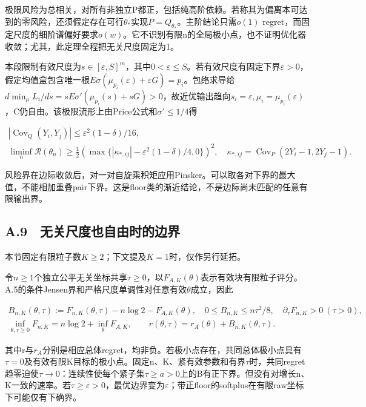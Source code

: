 \documentclass[11pt,a4paper]{article}
\begin{document}
极限风险为总相关，对所有非独立P都正，包括纯高阶依赖。若称其为偏离本可达到的零风险，还须假定存在可行\(\theta_*\)实现\(P=Q_{\theta_*}\)。主阶结论只需\(o(1)\)
regret，而固定尺度的细阶谱偏好要求\(o(w)\)。它不识别有限n的全局极小点，也不证明优化器收敛；尤其，此定理全程把无关尺度固定为1。

本段限制有效尺度为\(s\in[\varepsilon,S]^m\)，其中\(0<\varepsilon\le S\)。若有效尺度有固定下界\(\varepsilon>0\)，假定均值盒包含唯一根\(E\sigma(\mu_{p_i}(\varepsilon)+\varepsilon G)=p_i\)。包络求导给\(d\min_\mu L_i/ds=sE\sigma'(\mu_{p_i}(s)+sG)>0\)，故近优输出趋向\(s_i=\varepsilon,\mu_i=\mu_{p_i}(\varepsilon)\)，C仍自由。该极限流形上由Price公式和\(\sigma'\le1/4\)得

\[
\begin{gathered}
|\operatorname{Cov}_Q(Y_i,Y_j)|\le\varepsilon^2(1-\delta)/16,\\
\liminf_n\mathcal R(\theta_n)\ge\tfrac12
\left(\max\{|\kappa_{*,ij}|-\varepsilon^2(1-\delta)/4,0\}\right)^2,
\quad \kappa_{*,ij}=\operatorname{Cov}_P(2Y_i-1,2Y_j-1).
\end{gathered}
\tag{A.45}
\]

风险界在边际收敛后，对一对自旋乘积矩应用Pinsker。可以取各对下界的最大值，不能相加重叠pair下界。这是floor类的渐近结论，不是边际尚未匹配的任意有限输出界。

\subsection*{A.9　无关尺度也自由时的边界}\label{a.9-ux65e0ux5173ux5c3aux5ea6ux4e5fux81eaux7531ux65f6ux7684ux8fb9ux754c}

本节固定有限粒子数\(K\ge2\)；下文提及\(K=1\)时，仅作另行延拓。

令\(n\ge1\)个独立公平无关坐标共享\(\tau\ge0\)，以\(F_{A,K}(\theta)\)表示有效块有限粒子评分。A.5的条件Jensen界和严格尺度单调性对任意有效\(\theta\)成立，因此

\[
\begin{gathered}
B_{n,K}(\theta,\tau):=F_{n,K}(\theta,\tau)-n\log2-F_{A,K}(\theta),\quad
0\le B_{n,K}\le n\tau^2/8,\quad \partial_\tau F_{n,K}>0\ (\tau>0),\\
\inf_{\theta,\tau\ge0}F_{n,K}=n\log2+\inf_\theta F_{A,K},\qquad
r(\theta,\tau)=r_A(\theta)+B_{n,K}(\theta,\tau).
\end{gathered}
\tag{A.46}
\]

其中r与\(r_A\)分别是相应总体regret，均非负。若极小点存在，共同总体极小点具有\(\tau=0\)及有效有限K目标的极小点。固定n、K、紧有效参数和有界\(\tau\)时，共同regret趋零迫使\(\tau\to0\)：连续性使每个紧子集\(\tau\ge a>0\)上的B有正下界。但没有对增长n、K一致的速率。若\(\tau\ge\varepsilon>0\)，最优边界变为\(\varepsilon\)；带正floor的softplus在有限raw坐标下可能仅有下确界。
\end{document}
